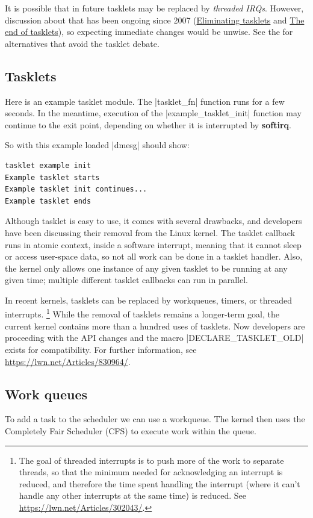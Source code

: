 \documentclass[10pt, oneside]{book}
\begin{document}
It is possible that in future tasklets may be replaced by \textit{threaded IRQs}.
However, discussion about that has been ongoing since 2007 (\href{https://lwn.net/Articles/239633}{Eliminating tasklets} and \href{https://lwn.net/Articles/960041/}{The end of tasklets}),
so expecting immediate changes would be unwise.
See the  for alternatives that avoid the tasklet debate.

\subsection{Tasklets}
\label{sec:tasklet}
Here is an example tasklet module.
The \cpp|tasklet_fn| function runs for a few seconds.
In the meantime, execution of the \cpp|example_tasklet_init| function may continue to the exit point,
depending on whether it is interrupted by \textbf{softirq}.


So with this example loaded \sh|dmesg| should show:

\begin{verbatim}
tasklet example init
Example tasklet starts
Example tasklet init continues...
Example tasklet ends
\end{verbatim}
Although tasklet is easy to use, it comes with several drawbacks, and developers have been discussing their removal from the Linux kernel.
The tasklet callback runs in atomic context, inside a software interrupt, meaning that it cannot sleep or access user-space data, so not all work can be done in a tasklet handler.
Also, the kernel only allows one instance of any given tasklet to be running at any given time; multiple different tasklet callbacks can run in parallel.

In recent kernels, tasklets can be replaced by workqueues, timers, or threaded interrupts.
\footnote{
The goal of threaded interrupts is to push more of the work to separate threads,
so that the minimum needed for acknowledging an interrupt is reduced,
and therefore the time spent handling the interrupt (where it can't handle any other interrupts at the same time) is reduced.
See \url{https://lwn.net/Articles/302043/}.
}
While the removal of tasklets remains a longer-term goal, the current kernel contains more than a hundred uses of tasklets.
Now developers are proceeding with the API changes and the macro \cpp|DECLARE_TASKLET_OLD| exists for compatibility.
For further information, see \url{https://lwn.net/Articles/830964/}.

\subsection{Work queues}
\label{sec:workqueue}
To add a task to the scheduler we can use a workqueue.
The kernel then uses the Completely Fair Scheduler (CFS) to execute work within the queue.
\end{document}
